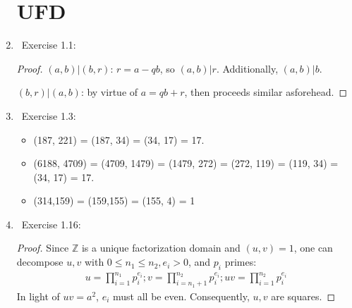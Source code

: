 \documentclass[11pt]{article}
\newcommand\0{\mathbf{0}}
\newcommand\ZZ{\mathbb{Z}}
\newcommand\<{\langle}
\renewcommand\>{\rangle}
\begin{document}
\begin{enumerate}
\section{UFD}
\item\ 
Exercise 1.1:
\begin{proof}
$(a,b)|(b,r)$: $r = a-qb$, so $(a,b)|r$. Additionally, $(a,b)|b$.\par
$(b,r)|(a,b)$: by virtue of $a = qb+r$, then proceeds similar asforehead.
\end{proof}
\item\ 
Exercise 1.3:
\begin{itemize}
    \item (187, 221) = (187, 34) = (34, 17) = 17.
    \item (6188, 4709) = (4709, 1479) = (1479, 272) = (272, 119) = (119, 34) = (34, 17) = 17.
    \item (314,159) = (159,155) = (155, 4) = 1
\end{itemize}
\item\
Exercise 1.16:
\begin{proof}
    Since $\ZZ$ is a unique factorization domain and $(u,v) = 1$, one can decompose $u,v$ with $0 \leq n_1 \leq n_2, e_i > 0$, and $p_i$ primes: 
\begin{eqnarray*}
    u = \prod_{i=1}^{n_1}p_i^{e_i};
    v = \prod_{i=n_1+1}^{n_2}p_i^{e_i};
    uv = \prod_{i=1}^{n_2}p_i^{e_i}
\end{eqnarray*}
In light of $uv = a^2$, $e_i$ must all be even. Consequently, $u,v$ are squares.


\end{proof}
\end{enumerate}
\end{document}
